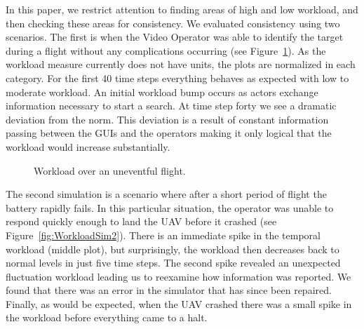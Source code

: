 In this paper, we restrict attention to finding areas of high and low workload, and then checking these areas for consistency.  We evaluated consistency using two scenarios.  The first is when the Video Operator was able to identify the target during a flight without any complications occurring (see Figure~\ref{fig:WorkloadSim1}). As the workload measure currently does not have units, the plots are normalized in each category. For the first 40 time steps everything behaves as expected with low to moderate workload. An initial workload bump occurs as actors exchange information necessary to start a search.   At time step forty we see a dramatic deviation from the norm. This deviation is a result of constant information passing between the GUIs and the operators
making it only
 logical that the workload would increase substantially.

\begin{figure}[h]
\center
\setlength{\abovecaptionskip}{1mm}
\setlength{\belowcaptionskip}{1mm}
\setlength{\textfloatsep}{1mm}
\setlength{\floatsep}{1mm}
\caption{Workload over an uneventful flight.}
\label{fig:WorkloadSim1}
\end{figure}

The second simulation is a scenario where after a short period of flight the battery rapidly fails. In this particular situation, the operator was unable to respond quickly enough to land the UAV before it crashed (see Figure~\ref{fig:WorkloadSim2}). There is an immediate spike in the temporal workload (middle plot), but surprisingly, the workload then decreases back to normal levels in just five time steps.
The second spike revealed an unexpected fluctuation workload leading us to reexamine how information was reported. We found that there was an error in the simulator that has since been repaired.
Finally, as would be expected, when the UAV crashed there was a small spike in the workload before everything came to a halt. 

